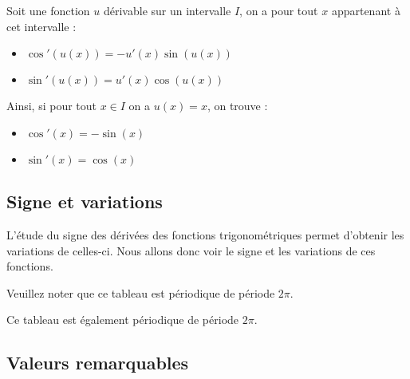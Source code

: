 	\begin{formula}
		Soit une fonction $u$ dérivable sur un intervalle $I$, on a pour tout $x$ appartenant à cet intervalle :
		\begin{itemize}
			\item $\cos'(u(x)) = -u'(x)\sin(u(x))$
			\item $\sin'(u(x)) = u'(x)\cos(u(x))$
		\end{itemize}
	\end{formula}

	\begin{formula}[Dérivée]
		Ainsi, si pour tout $x \in I$ on a $u(x) = x$, on trouve :
		\begin{itemize}
			\item $\cos'(x) = -\sin(x)$
			\item $\sin'(x) = \cos(x)$
		\end{itemize}
	\end{formula}

	\subsection{Signe et variations}

	L'étude du signe des dérivées des fonctions trigonométriques permet d'obtenir les variations de celles-ci. Nous allons donc voir le signe et les variations de ces fonctions.

	\begin{formula}
		\contentwidth[big]

		Veuillez noter que ce tableau est périodique de période $2\pi$.
	\end{formula}

	\begin{formula}
		\contentwidth[big]

		Ce tableau est également périodique de période $2\pi$.
	\end{formula}

	\subsection{Valeurs remarquables}

